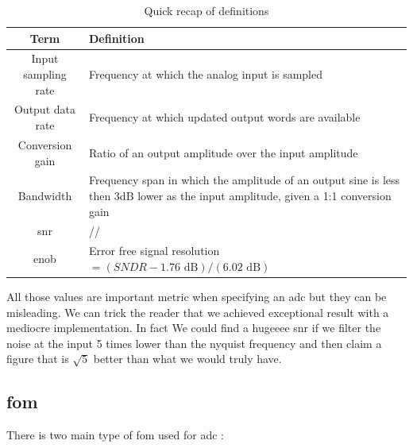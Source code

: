 \documentclass{report}
\begin{document}
\begin{table}[H]
    \centering
    \begin{tabular}{|c|m{7cm}|}
        \hline
         Term & Definition  \\
         \hline
         Input sampling rate & Frequency at which the analog input is sampled\\
         \hline
         Output data rate & Frequency at which updated output words are available\\
         \hline
         Conversion gain & Ratio of an output amplitude over the input amplitude \\
         \hline
         Bandwidth & Frequency span in which the amplitude of an output sine is less then 3dB lower as the input amplitude, given a 1:1 conversion gain\\
         \hline
         \gls{snr} & // \\
         \hline
         \gls{enob} & Error free signal resolution $=(SNDR-1.76\text{ dB})/(6.02 \text{ dB})$\\
         \hline
    \end{tabular}
    \caption{Quick recap of definitions}
    \label{tab:my_label}
\end{table}

All those values are important metric when specifying an \gls{adc} but they can be misleading. We can trick the reader that we achieved exceptional result with a mediocre implementation. In fact We could find a hugeeee \gls{snr} if we filter the noise at the input 5 times lower than the nyquist frequency and then claim a figure that is $\sqrt{5}$ better than what we would truly have.

\subsection{\gls{fom}}

There is two main type of \gls{fom} used for \gls{adc} : 
\end{document}
